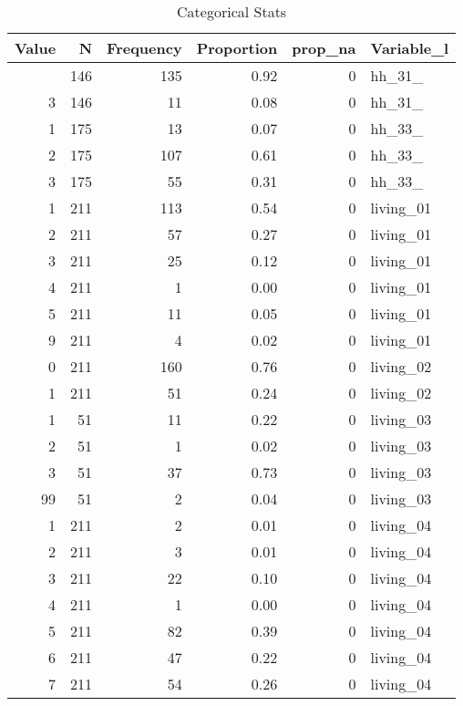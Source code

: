 \begin{table}[!t]
\caption*{
{\large Categorical Stats}
} 
\fontsize{12.0pt}{14.4pt}\selectfont
\begin{tabular*}{\linewidth}{@{\extracolsep{\fill}}rrrrrl}
\toprule
Value & N & Frequency & Proportion & prop\_na & Variable\_l \\ 
\midrule\addlinespace[2.5pt]
2 & 146 & 135 & 0.92 & 0 & hh\_31\_ \\ 
3 & 146 & 11 & 0.08 & 0 & hh\_31\_ \\ 
1 & 175 & 13 & 0.07 & 0 & hh\_33\_ \\ 
2 & 175 & 107 & 0.61 & 0 & hh\_33\_ \\ 
3 & 175 & 55 & 0.31 & 0 & hh\_33\_ \\ 
1 & 211 & 113 & 0.54 & 0 & living\_01 \\ 
2 & 211 & 57 & 0.27 & 0 & living\_01 \\ 
3 & 211 & 25 & 0.12 & 0 & living\_01 \\ 
4 & 211 & 1 & 0.00 & 0 & living\_01 \\ 
5 & 211 & 11 & 0.05 & 0 & living\_01 \\ 
9 & 211 & 4 & 0.02 & 0 & living\_01 \\ 
0 & 211 & 160 & 0.76 & 0 & living\_02 \\ 
1 & 211 & 51 & 0.24 & 0 & living\_02 \\ 
1 & 51 & 11 & 0.22 & 0 & living\_03 \\ 
2 & 51 & 1 & 0.02 & 0 & living\_03 \\ 
3 & 51 & 37 & 0.73 & 0 & living\_03 \\ 
99 & 51 & 2 & 0.04 & 0 & living\_03 \\ 
1 & 211 & 2 & 0.01 & 0 & living\_04 \\ 
2 & 211 & 3 & 0.01 & 0 & living\_04 \\ 
3 & 211 & 22 & 0.10 & 0 & living\_04 \\ 
4 & 211 & 1 & 0.00 & 0 & living\_04 \\ 
5 & 211 & 82 & 0.39 & 0 & living\_04 \\ 
6 & 211 & 47 & 0.22 & 0 & living\_04 \\ 
7 & 211 & 54 & 0.26 & 0 & living\_04 \\ 
\bottomrule
\end{tabular*}
\end{table}

